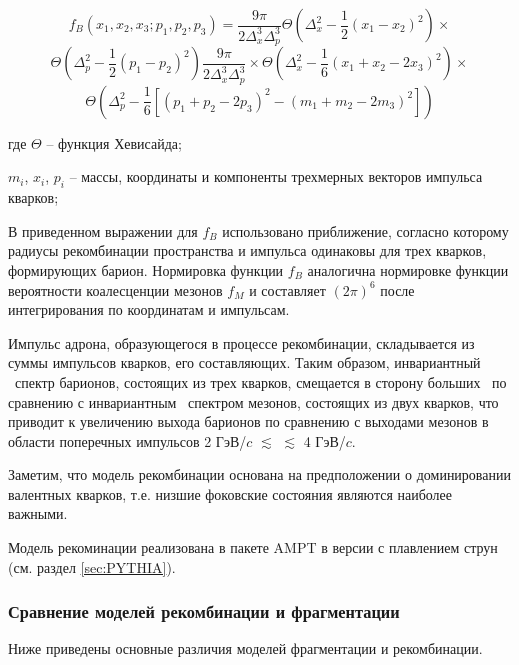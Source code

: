 $$f_B(x_1, x_2, x_3; p_1, p_2, p_3) = \frac{9 \pi}{2\Delta_{x}^3 \Delta_{p}^3} 
\Theta \left( \Delta_{x}^2 - \frac{1}{2} (x_1 - x_2)^2\right) \times $$
$$\Theta \left( \Delta_{p}^2 - \frac{1}{2} (p_1 - p_2)^2\right) \frac{9 \pi}{2\Delta_{x}^3 \Delta_{p}^3}\times
\Theta \left( \Delta_{x}^2 - \frac{1}{6} (x_1 + x_2 - 2 x_3)^2\right) \times $$
$$\Theta \left( \Delta_{p}^2 - \frac{1}{6} \left[ (p_1 + p_2 - 2 p_3)^2 - (m_1 + m_2 -2 m_3)^2 \right] \right) $$

где $\Theta$ -- функция Хевисайда;

$m_i$, $x_i$, $p_i$ -- массы, координаты и компоненты трехмерных векторов импульса кварков;


В приведенном выражении для $f_B$ использовано приближение, согласно которому радиусы рекомбинации пространства и импульса одинаковы для трех кварков, формирующих барион. Нормировка функции $f_B$ аналогична нормировке функции вероятности коалесценции мезонов $f_M$ и составляет $(2\pi)^6$ после интегрирования по координатам и импульсам. 

Импульс адрона, образующегося в процессе рекомбинации, складывается из суммы импульсов кварков, его составляющих. Таким образом, инвариантный \pt \ спектр барионов, состоящих из трех кварков, смещается в сторону больших \pT \ по сравнению с инвариантным \pT \ спектром мезонов, состоящих из двух кварков, что приводит к увеличению выхода барионов по сравнению с выходами мезонов в области поперечных импульсов 2 ГэВ/$c$ $\lesssim$ \pT $\lesssim$ 4 ГэВ/$c$. 

Заметим, что модель рекомбинации основана на предположении о доминировании валентных кварков, т.е. низшие фоковские состояния являются наиболее важными. 

Модель рекоминации реализована в пакете AMPT в версии с плавлением струн \cite{AMPT} (см. раздел \ref{sec:PYTHIA}). 


\subsubsection{Сравнение моделей рекомбинации и фрагментации}
Ниже приведены основные различия моделей фрагментации и рекомбинации. 

